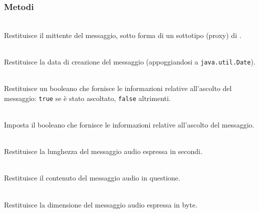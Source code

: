 \subsubsection*{Metodi}
\begin{description}
  \item{}\\
Restituisce il mittente del messaggio, sotto forma di un sottotipo (proxy) di .
  \item{}\\
Restituisce la data di creazione del messaggio (appoggiandosi a \texttt{java.util.Date}).
  \item{}\\
Restituisce un booleano che fornisce le informazioni relative all'ascolto del messaggio: \texttt{true} se è stato ascoltato, \texttt{false} altrimenti.
  \item{}\\
Imposta il booleano che fornisce le informazioni relative all'ascolto del messaggio.
  \item{}\\
Restituisce la lunghezza del messaggio audio espressa in secondi.
  \item{}\\
Restituisce il contenuto del messaggio audio in questione.
  \item{}\\
Restituisce la dimensione del messaggio audio espressa in byte.
\end{description}

